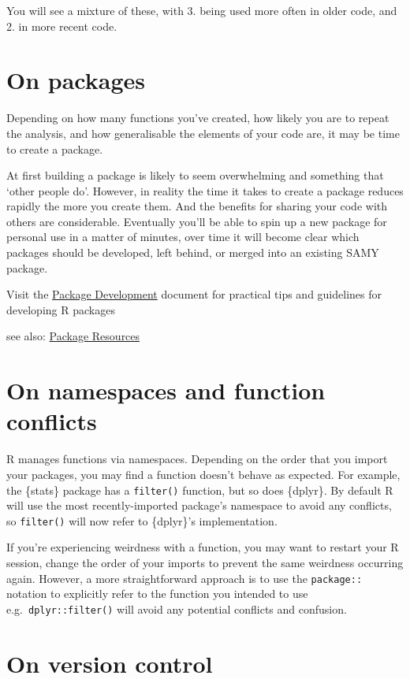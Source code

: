 \documentclass[
  letterpaper,
  DIV=11,
  numbers=noendperiod]{scrreprt}
\begin{document}
You will see a mixture of these, with 3. being used more often in older
code, and 2. in more recent code.

\section{On packages}\label{on-packages}

Depending on how many functions you've created, how likely you are to
repeat the analysis, and how generalisable the elements of your code
are, it may be time to create a package.

At first building a package is likely to seem overwhelming and something
that `other people do'. However, in reality the time it takes to create
a package reduces rapidly the more you create them. And the benefits for
sharing your code with others are considerable. Eventually you'll be
able to spin up a new package for personal use in a matter of minutes,
over time it will become clear which packages should be developed, left
behind, or merged into an existing SAMY package.

Visit the \href{package_development.qmd}{Package Development} document
for practical tips and guidelines for developing R packages

see also: \hyperref[package-development]{Package Resources}

\section{On namespaces and function
conflicts}\label{on-namespaces-and-function-conflicts}

R manages functions via namespaces. Depending on the order that you
import your packages, you may find a function doesn't behave as
expected. For example, the \{stats\} package has a \texttt{filter()}
function, but so does \{dplyr\}. By default R will use the most
recently-imported package's namespace to avoid any conflicts, so
\texttt{filter()} will now refer to \{dplyr\}'s implementation.

If you're experiencing weirdness with a function, you may want to
restart your R session, change the order of your imports to prevent the
same weirdness occurring again. However, a more straightforward approach
is to use the \texttt{package::} notation to explicitly refer to the
function you intended to use e.g.~\texttt{dplyr::filter()} will avoid
any potential conflicts and confusion.

\section{On version control}\label{on-version-control}
\end{document}
